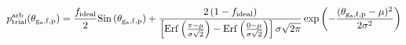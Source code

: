 \documentclass[12pt]{article}
\begin{document}
\begin{displaymath}
p_{\rm trial}^{\rm arb}(\theta_{\rm g_a,f,p}) = 
{{f_{\rm ideal}}\over{2}} {\rm Sin}\left(\theta_{\rm g_a,f,p}\right) +
{
{2\left(1 - f_{\rm ideal}\right)}
\over
{
\left[
{\rm Erf}\left({{\pi-\mu}\over{\sigma \sqrt{2}}}\right)
- {\rm Erf}\left({{0-\mu}\over{\sigma \sqrt{2}}}\right)
\right]
\sigma \sqrt{2 \pi}
}
}
\exp\left(-{{(\theta_{\rm g_a,f,p} - \mu)^2}\over{2 \sigma^2}}\right)
\end{displaymath}
\end{document}
